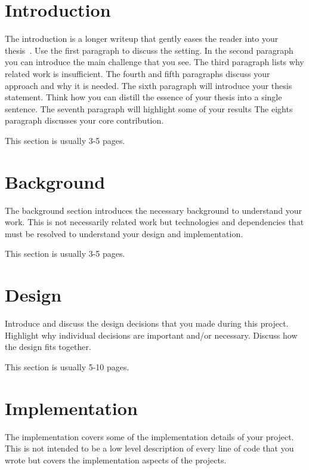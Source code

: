 \documentclass[a4paper,11pt,oneside]{report}
\begin{document}
\chapter{Introduction}

The introduction is a longer writeup that gently eases the reader into your
thesis~\cite{dinesh20oakland}. Use the first paragraph to discuss the setting.
In the second paragraph you can introduce the main challenge that you see.
The third paragraph lists why related work is insufficient.
The fourth and fifth paragraphs discuss your approach and why it is needed.
The sixth paragraph will introduce your thesis statement. Think how you can
distill the essence of your thesis into a single sentence.
The seventh paragraph will highlight some of your results
The eights paragraph discusses your core contribution.

This section is usually 3-5 pages.

\chapter{Background}

The background section introduces the necessary background to understand your
work. This is not necessarily related work but technologies and dependencies
that must be resolved to understand your design and implementation.

This section is usually 3-5 pages.


\chapter{Design}

Introduce and discuss the design decisions that you made during this project.
Highlight why individual decisions are important and/or necessary. Discuss
how the design fits together.

This section is usually 5-10 pages.


\chapter{Implementation}

The implementation covers some of the implementation details of your project.
This is not intended to be a low level description of every line of code that
you wrote but covers the implementation aspects of the projects.
\end{document}
